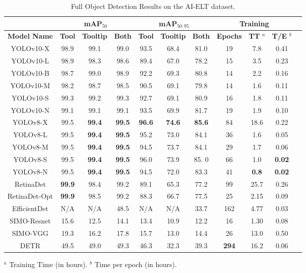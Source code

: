 \begin{table*}[h]
\centering
\caption{Full Object Detection Results on the AI-ELT dataset.}
\label{fig:aieltresults}
\begin{tabular}{|c|c|c|c|c|c|c|c|c|c|c|}
\hline
\multicolumn{1}{|c|}{} & \multicolumn{3}{c|}{\textbf{mAP$_{50}$}} & \multicolumn{3}{c|}{\textbf{mAP$_{50:95}$}} & \multicolumn{3}{c|}{\textbf{Training}} \\
\hline
\textbf{Model Name} & \textbf{Tool} & \textbf{Tooltip} & \textbf{Both} & \textbf{Tool} & \textbf{Tooltip} & \textbf{Both} & \textbf{Epochs} & \textbf{TT} $^a$ & \textbf{T/E} $^b$ \\ 
\hline
YOLOv10-X & 98.9 & 99.1 & 99.0 & 93.5 & 68.4 & 81.0 & 19 & 7.8 & 0.41 \\ 
YOLOv10-L & 98.9 & 98.3 & 98.6 & 89.4 & 67.0 & 78.2 & 15 & 3.5 & 0.23 \\ 
YOLOv10-B & 98.7 & 99.0 & 98.9 & 92.2 & 69.3 & 80.8 & 14 & 2.2 & 0.16 \\ 
YOLOv10-M & 98.2 & 98.7 & 98.5 & 90.5 & 69.1 & 79.8 & 14 & 1.6 & 0.11 \\ 
YOLOv10-S & 99.3 & 99.2 & 99.3 & 92.7 & 69.1 & 80.9 & 16 & 1.8 & 0.11 \\ 
YOLOv10-N & 99.1 & 99.1 & 99.1 & 93.5 & 69.9 & 81.7 & 19 & 1.9 & 0.10 \\ 
YOLOv8-X & 99.5 & \textbf{99.4} & \textbf{99.5} & \textbf{96.6} & \textbf{74.6} & \textbf{85.6} & 84 & 18.6 & 0.22 \\ 
YOLOv8-L & 99.5 & \textbf{99.4} & \textbf{99.5} & 95.2 & 73.0 & 84.1 & 36 & 1.6 & 0.05 \\ 
YOLOv8-M & 99.5 & \textbf{99.4} & \textbf{99.5} & 94.5 & 73.7 & 84.1 & 29 & 1.7 & 0.06 \\ 
YOLOv8-S & 99.5 & \textbf{99.4} & \textbf{99.5} & 96.0 & 73.9 & 85. 0& 66 & 1.0 & \textbf{0.02} \\ 
YOLOv8-N & 99.5 & \textbf{99.4} & \textbf{99.5} & 94.5 & 72.0 & 83.3 & 41 & \textbf{0.8} & \textbf{0.02} \\ 
RetinaDet & \textbf{99.9} & 98.4 & 99.2 & 89.1 & 65.3 & 77.2 & 99 & 25.7 & 0.26 \\ 
RetinaDet-Opt & \textbf{99.9} & 98.5 & 99.2 & 88.3 & 66.7 & 77.5 & 25 & 2.15 & 0.09 \\ 
EfficientDet & N/A & N/A & 48.5 & N/A & N/A & 33.7 & 162 & 4.77 & 0.03 \\ 
SIMO-Resnet & 15.6 & 12.5 & 14.1 & 13.4 & 10.9 & 12.2 & 16 & 1.30 & 0.08 \\ 
SIMO-VGG & 19.3 & 16.2 & 17.8 & 15.7 & 13.0 & 14.4 & 26 & 13.0 & 0.50 \\ 
DETR & 49.5 & 49.0 & 49.3 & 46.3 & 32.3 & 39.3 & \textbf{294} & 16.2 & 0.06 \\
\hline
\end{tabular}
\newline
\footnotesize{$^a$ Training Time (in hours). $^b$ Time per epoch (in hours).}
\end{table*}


